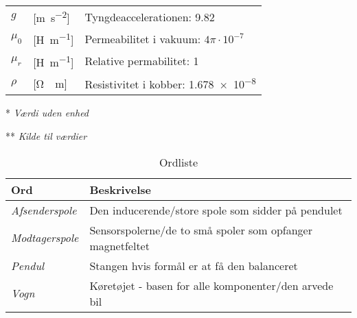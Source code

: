 \begin{table}[h!]
\begin{threeparttable}
\begin{tabular}{l l l}
\midrule
$g$         &	[\si{\meter\per\second^2}]		&	Tyngdeaccelerationen: \num{9,82} \\
$\mu_0$		&	[\si{\henry\per\meter}]			&	Permeabilitet i vakuum: $4\pi\cdot10^{-7}$ \\
$\mu_r$		&	[\si{\henry\per\meter}]			&	Relative permabilitet: 1\\
$\rho$		&	[\si{\ohm\cdot\meter}]			&
Resistivitet i kobber: \num{1,678e-8} \\
\bottomrule
\end{tabular}
\begin{tablenotes}
\item[*] \textit{Værdi uden enhed}
\item[**] \textit{Kilde til værdier \cite{Halliday2014}}
\end{tablenotes}
\end{threeparttable}
\end{table}

\begin{table}[h!]
	\centering
	\caption{Ordliste}
	\label{tab:ordliste}
	\begin{threeparttable}
		\begin{tabular}{l l}
			\toprule
			\multicolumn{1}{l}{Ord}       &
			\multicolumn{1}{l}{Beskrivelse}  \\ 
			\midrule
			\textit{Afsenderspole}	& Den inducerende/store spole som sidder på pendulet\\
			\textit{Modtagerspole}	& Sensorspolerne/de to små spoler som opfanger magnetfeltet\\
			\textit{Pendul}			& Stangen hvis formål er at få den balanceret\\
			\textit{Vogn}			& Køretøjet - basen for alle komponenter/den arvede bil\\
			
			\bottomrule
		\end{tabular}
	\end{threeparttable}
\end{table}

